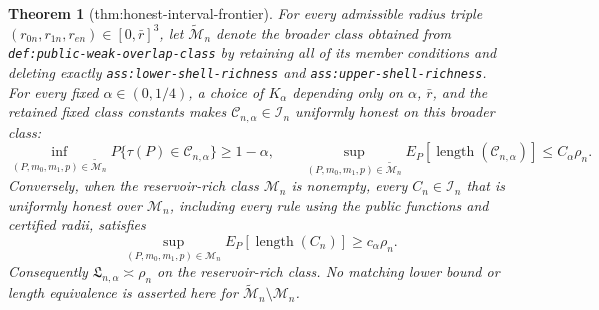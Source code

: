 \documentclass{article}
\newtheorem{theorem}{Theorem}
\begin{document}
\begin{theorem}[thm:honest-interval-frontier]\label{thm:honest-interval-frontier}
For every admissible radius triple \((r_{0n},r_{1n},r_{en})\in[0,\bar r]^3\), let \(\widetilde{\mathcal M}_n\) denote the broader class obtained from \texttt{def:public-weak-overlap-class} by retaining all of its member conditions and deleting exactly \texttt{ass:lower-shell-richness} and \texttt{ass:upper-shell-richness}.  For every fixed \(\alpha\in(0,1/4)\), a choice of \(K_\alpha\) depending only on \(\alpha\), \(\bar r\), and the retained fixed class constants makes \(\mathcal C_{n,\alpha}\in\mathcal I_n\) uniformly honest on this broader class:
\[
\inf_{(P,m_0,m_1,p)\in\widetilde{\mathcal M}_n}
P\{\tau(P)\in\mathcal C_{n,\alpha}\}\geq1-\alpha,
\qquad
\sup_{(P,m_0,m_1,p)\in\widetilde{\mathcal M}_n}
E_P[\operatorname{length}(\mathcal C_{n,\alpha})]
\leq C_\alpha\rho_n.
\]
Conversely, when the reservoir-rich class \(\mathcal M_n\) is nonempty, every \(C_n\in\mathcal I_n\) that is uniformly honest over \(\mathcal M_n\), including every rule using the public functions and certified radii, satisfies
\[
\sup_{(P,m_0,m_1,p)\in\mathcal M_n}
E_P[\operatorname{length}(C_n)]\geq c_\alpha\rho_n.
\]
Consequently \(\mathfrak L_{n,\alpha}\asymp\rho_n\) on the reservoir-rich class.  No matching lower bound or length equivalence is asserted here for \(\widetilde{\mathcal M}_n\setminus\mathcal M_n\).
\end{theorem}
\end{document}
